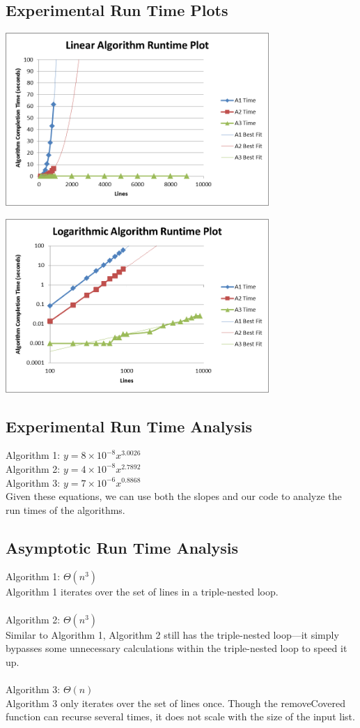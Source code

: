\documentclass{article}
\begin{document}
\subsection*{Experimental Run Time Plots}
\centerline{\includegraphics[width=0.75\textwidth]{plot1.png}}
\centerline{\includegraphics[width=0.75\textwidth]{plot2.png}}

\pagebreak

\subsection*{Experimental Run Time Analysis}
Algorithm 1: $y=8 \times 10^{-8}x^{3.0026}$\\
Algorithm 2: $y=4 \times 10^{-8}x^{2.7892}$\\
Algorithm 3: $y=7 \times 10^{-6}x^{0.8868}$\\

Given these equations, we can use both the slopes and our code to analyze the run times of the algorithms.

\subsection*{Asymptotic Run Time Analysis}
Algorithm 1: $\Theta(n^3)$\\
\indent Algorithm 1 iterates over the set of lines in a triple-nested loop.\\\\
Algorithm 2: $\Theta(n^3)$\\
\indent Similar to Algorithm 1, Algorithm 2 still has the triple-nested loop---it simply bypasses some unnecessary calculations within the triple-nested loop to speed it up.\\\\
Algorithm 3: $\Theta(n)$\\
\indent Algorithm 3 only iterates over the set of lines once.  Though the removeCovered function can recurse several times, it does not scale with the size of the input list.
\end{document}

